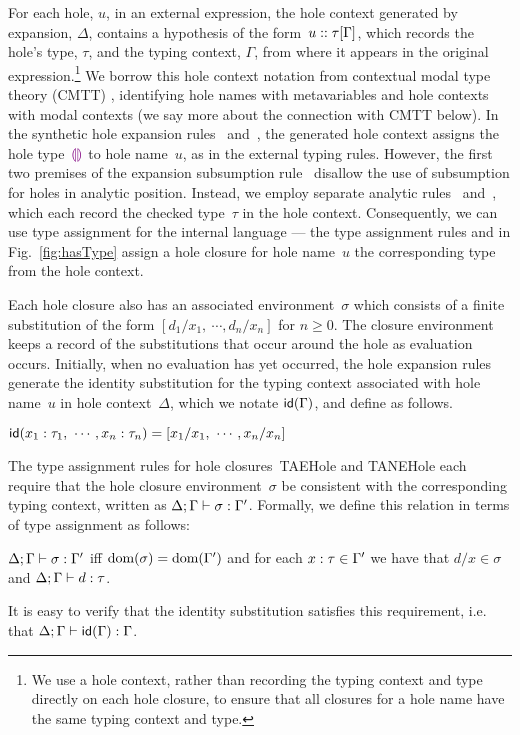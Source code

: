 %
For each hole, $u$, in an external expression, the hole context generated by expansion, $\Delta$, contains a hypothesis of the form~$u :: \tau[\Gamma]$, which records the hole's type, $\tau$, and the typing context, $\Gamma$, from where it appears in the original expression.\footnote{
We use a hole context, rather than recording the typing context and type directly on each hole closure, to ensure that all closures for a hole name have the same typing context and type.}
%
We borrow this hole context notation from contextual modal type theory (CMTT) \cite{Nanevski2008}, identifying hole names with metavariables and hole contexts with modal contexts (we say more about the connection with CMTT below).
%
%
In the synthetic hole expansion rules~ and~, the generated hole context assigns the hole type~$\textcolor{violet}{\llparenthesis}\textcolor{violet}{\rrparenthesis}$ to hole name~$u$, as in the external typing rules.
%
However, the first two premises of the expansion subsumption rule~ disallow the use of subsumption for holes in analytic position.
%
Instead, we employ separate analytic rules~ and~, which each record the checked type~$\tau$ in the hole context.
%
Consequently, we can use type assignment for the internal language --- the type assignment rules  and  in Fig.~\ref{fig:hasType} assign a hole closure for hole name~$u$ the corresponding type from the hole context.

Each hole closure also has an associated environment~$\sigma$ which consists of a finite substitution of the form $[d_1/x_1, ~\cdots, d_n/x_n]$ for $n \geq 0$.
%
The closure environment keeps a record of the substitutions that occur around the hole as evaluation occurs.
%
Initially, when no evaluation has yet occurred, the hole expansion rules generate the identity substitution for the typing context associated with hole name~$u$ in hole context~$\Delta$, which we notate $\mathsf{id}(\Gamma)$, and define as follows.
%
\begin{defn} $\mathsf{id}(x_1 : \tau_1, ~\cdots, x_n : \tau_n) = [x_1/x_1, ~\cdots, x_n/x_n]$
\end{defn}
\noindent
The type assignment rules for hole closures~{TAEHole} and {TANEHole} each require that the hole closure environment~$\sigma$ be consistent with the corresponding typing context, written as $\Delta; \Gamma \vdash \sigma : \Gamma'$.
%
Formally, we define this relation in terms of type assignment as follows:
\begin{defn}
$\Delta; \Gamma \vdash \sigma : \Gamma'$ iff $\text{dom}(\sigma) = \text{dom}(\Gamma')$ and for each $x : \tau \in \Gamma'$ we have that $d/x \in \sigma$ and $\Delta; \Gamma \vdash d : \tau$.
\end{defn}
\noindent
It is easy to verify that the identity substitution satisfies this requirement, i.e. that $\Delta; \Gamma \vdash \mathsf{id}(\Gamma) : \Gamma$.

